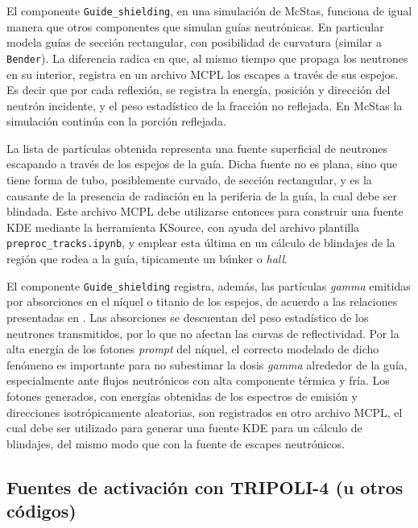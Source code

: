 El componente \verb|Guide_shielding|, en una simulación de McStas, funciona de igual manera que otros componentes que simulan guías neutrónicas. En particular modela guías de sección rectangular, con posibilidad de curvatura (similar a \verb|Bender|). La diferencia radica en que, al mismo tiempo que propaga los neutrones en su interior, registra en un archivo MCPL los escapes a través de sus espejos. Es decir que por cada reflexión, se registra la energía, posición y dirección del neutrón incidente, y el peso estadístico de la fracción no reflejada. En McStas la simulación continúa con la porción reflejada.

La lista de partículas obtenida representa una fuente superficial de neutrones escapando a través de los espejos de la guía. Dicha fuente no es plana, sino que tiene forma de tubo, posiblemente curvado, de sección rectangular, y es la causante de la presencia de radiación en la periferia de la guía, la cual debe ser blindada. Este archivo MCPL debe utilizarse entonces para construir una fuente KDE mediante la herramienta KSource, con ayuda del archivo plantilla \verb|preproc_tracks.ipynb|, y emplear esta última en un cálculo de blindajes de la región que rodea a la guía, tipicamente un búnker o \emph{hall}.

El componente \verb|Guide_shielding| registra, además, las partículas \emph{gamma} emitidas por absorciones en el níquel o titanio de los espejos, de acuerdo a las relaciones presentadas en \cite{abs}. Las absorciones se descuentan del peso estadístico de los neutrones transmitidos, por lo que no afectan las curvas de reflectividad. Por la alta energía de los fotones \emph{prompt} del níquel, el correcto modelado de dicho fenómeno es importante para no subestimar la dosis \emph{gamma} alrededor de la guía, especialmente ante flujos neutrónicos con alta componente térmica y fría. Los fotones generados, con energías obtenidas de los espectros de emisión y direcciones isotrópicamente aleatorias, son registrados en otro archivo MCPL, el cual debe ser utilizado para generar una fuente KDE para un cálculo de blindajes, del mismo modo que con la fuente de escapes neutrónicos.


\subsection{Fuentes de activación con TRIPOLI-4 (u otros códigos)}

